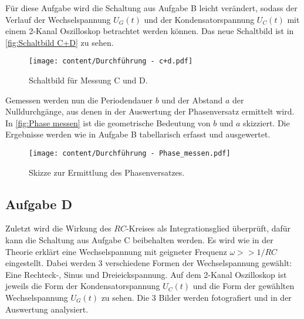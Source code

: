 Für diese Aufgabe wird die Schaltung aus Aufgabe B leicht verändert, sodass der Verlauf der Wechselspannung  $U_{G}(t)$
und der Kondensatorspannung $U_{C}(t)$ mit einem 2-Kanal Oszilloskop betrachtet werden können.
Das neue Schaltbild ist in \autoref{fig:Schaltbild C+D} zu sehen.

\begin{figure}%
    \centering
    \texttt{[image: content/Durchführung - c+d.pdf]}
    \caption{Schaltbild für Messung C und D. \cite{v353}}
    \label{fig:Schaltbild C+D}
\end{figure}

Gemessen werden nun die Periodendauer $b$ und der Abstand $a$ der Nulldurchgänge, aus denen in der Auswertung
der Phasenversatz ermittelt wird. In \autoref{fig:Phase messen} ist die geometrische Bedeutung von $b$ und $a$ skizziert.
Die Ergebnisse werden wie in Aufgabe B tabellarisch erfasst und ausgewertet.

\begin{figure}%
    \centering
    \texttt{[image: content/Durchführung - Phase\_messen.pdf]}
    \caption{Skizze zur Ermittlung des Phasenversatzes. \cite{v353}}
    \label{fig:Phase messen}
\end{figure}

\subsection{Aufgabe D}

Zuletzt wird die Wirkung des $RC$-Kreises als Integrationsglied überprüft, dafür kann die Schaltung aus
Aufgabe C beibehalten werden. Es wird wie in der Theorie erklärt eine Wechselspannung mit
geigneter Frequenz $\omega >> 1/RC$ eingestellt.
Dabei werden 3 verschiedene Formen der Wechselspannung gewählt: Eine Rechteck-, Sinus und Dreieickspannung.
Auf dem 2-Kanal Oszilloskop ist jeweils die Form der Kondensatorspannung $U_{C}(t)$ und die Form der gewählten
Wechselspannung $U_{G}(t)$ zu sehen.
Die 3 Bilder werden fotografiert und in der Auswertung analysiert.